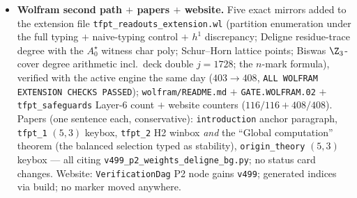 \documentclass[11pt]{article}
\begin{document}
\begin{itemize}[leftmargin=1.5em]
$y^3=(z{-}1)(z{-}i)(z{+}1)^2(z{+}i)^2$ (genus $2$; NOT the pillowcase double, genus $1$, $j=1728$ ---
the deck side); $p_*\mathcal O_Y=\mathcal O\oplus\mathcal O(-2)^2$; the regular-representation model
lands on $\{0,2,2\}$ $=$ the \emph{unstable} Schur--Horn companion ($h^0=1$): integrality and the sum
rule come \emph{out} of the correspondence, stability is the selector. \emph{Negative controls}: no
positivity $\to4$/$31$ solutions; $\deg-3/-5$ breaks; $n$-mark scan $e_2=(n{-}2)(n{+}1)/2=5$ ONLY at
$n=4$ (the value, not the uniqueness, is the $n{=}4$ content); MS-rational $e_2=\tfrac{16}3$,
$\tfrac{44}9$. \emph{Honest residuals} (P2 stays an axiom): R1 module identification \mC\
(\texttt{QGEO.SYM} territory), R2 (U) \mC\ (\texttt{v33}/\texttt{v40}), R3 analytic monodromy
(Numerical, \texttt{v117} check 4); non-circular (neither \texttt{v23}'s splitting input nor
\texttt{v115}'s $\operatorname{diag}A_0=a/4$ input used); the \texttt{v491} direction-reversal note
carries over. Ledger: new row \texttt{P2.TYPING.01}; the \texttt{v491}/\texttt{P2.PARTITION.01} row
records ``typing residual sharpened by \texttt{v499}'' (\texttt{v491} stays active, no supersede).
Registry $+$ \texttt{run\_all} (493 modules, suite green).
\item \textbf{Wolfram second path $+$ papers $+$ website.} Five exact mirrors added to the extension
file \texttt{tfpt\_readouts\_extension.wl} (partition enumeration under the full typing $+$ naive-typing
control $+$ $h^1$ discrepancy; Deligne residue-trace degree with the $A_0^\star$ witness char poly;
Schur--Horn lattice points; Biswas $\Z_3$-cover degree arithmetic incl.\ deck double $j=1728$; the
$n$-mark formula), verified with the active engine the same day ($403\to408$, \texttt{ALL WOLFRAM
EXTENSION CHECKS PASSED}); \texttt{wolfram/README.md} $+$ \texttt{GATE.WOLFRAM.02} $+$
\texttt{tfpt\_safeguards} Layer-6 count $+$ website counters ($116/116+408/408$). Papers (one sentence
each, conservative): \texttt{introduction} anchor paragraph, \texttt{tfpt\_1} $(5,3)$ keybox,
\texttt{tfpt\_2} H2 winbox \emph{and} the ``Global computation'' theorem (the balanced selection typed
as stability), \texttt{origin\_theory} $(5,3)$ keybox --- all citing
\texttt{v499\_p2\_weights\_deligne\_bg.py}; no status card changes. Website: \texttt{VerificationDag}
P2 node gains \texttt{v499}; generated indices via build; no marker moved anywhere.
\end{itemize}
\end{document}
